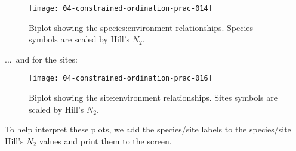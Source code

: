 \documentclass[a4paper,10pt]{article}
\begin{document}
\begin{figure}[t]
\begin{center}
\texttt{[image: 04-constrained-ordination-prac-014]}
\caption{\label{species_n2}Biplot showing the species:environment relationships. Species symbols are scaled by Hill's $N_2$.}
\end{center}
\end{figure}

...~and for the sites:

\begin{Schunk}
\end{Schunk}

\begin{figure}[t]
\begin{center}
\texttt{[image: 04-constrained-ordination-prac-016]}
\caption{\label{sites_n2}Biplot showing the site:environment relationships. Sites symbols are scaled by Hill's $N_2$.}
\end{center}
\end{figure}

To help interpret these plots, we add the species/site labels to the species/site Hill's $N_2$ values and print them to the screen.
\end{document}
